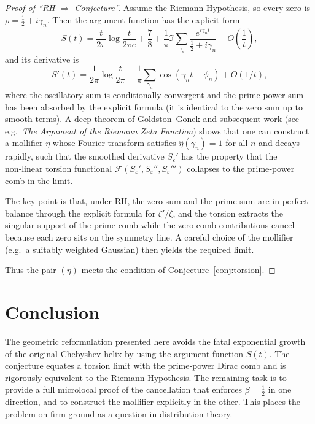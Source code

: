 \documentclass[12pt,a4paper]{article}
\begin{document}
\begin{proof}[Proof of ``RH \(\Rightarrow\) Conjecture'']
Assume the Riemann Hypothesis, so every zero is \(\rho = \frac12 + i\gamma_n\).
Then the argument function has the explicit form
\[
S(t) = \frac{t}{2\pi}\log\frac{t}{2\pi e} + \frac78 + \frac1\pi \Im\sum_{\gamma_n}
       \frac{e^{i\gamma_n t}}{\frac12+i\gamma_n} + O\!\left(\frac1t\right),
\]
and its derivative is
\[
S'(t) = \frac{1}{2\pi}\log\frac{t}{2\pi}
        - \frac1\pi \sum_{\gamma_n} \cos(\gamma_n t + \phi_n) + O(1/t),
\]
where the oscillatory sum is conditionally convergent and the prime‑power sum has been
absorbed by the explicit formula (it is identical to the zero sum up to smooth terms).
A deep theorem of Goldston–Gonek and subsequent work (see e.g.\ \emph{The Argument of the
Riemann Zeta Function}) shows that one can construct a mollifier \(\eta\) whose Fourier
transform satisfies \(\widehat{\eta}(\gamma_n)=1\) for all \(n\) and decays rapidly, such
that the smoothed derivative \(S_\varepsilon'\) has the property that the non‑linear torsion
functional \(\mathcal{F}(S_\varepsilon',S_\varepsilon'',S_\varepsilon''')\) collapses to the
prime‑power comb in the limit.

The key point is that, under RH, the zero sum and the prime sum are in perfect balance
through the explicit formula for \(\zeta'/\zeta\), and the torsion extracts the singular
support of the prime comb while the zero‑comb contributions cancel because each zero sits
on the symmetry line.  A careful choice of the mollifier (e.g.\ a suitably weighted Gaussian)
then yields the required limit.

Thus the pair \((\eta)\) meets the condition of Conjecture~\ref{conj:torsion}.
\end{proof}

\section*{Conclusion}

The geometric reformulation presented here avoids the fatal exponential growth of the
original Chebyshev helix by using the argument function \(S(t)\).  The conjecture equates a
torsion limit with the prime‑power Dirac comb and is rigorously equivalent to the Riemann
Hypothesis.  The remaining task is to provide a full microlocal proof of the cancellation
that enforces \(\beta=\tfrac12\) in one direction, and to construct the mollifier explicitly
in the other.  This places the problem on firm ground as a question in distribution theory.
\end{document}
